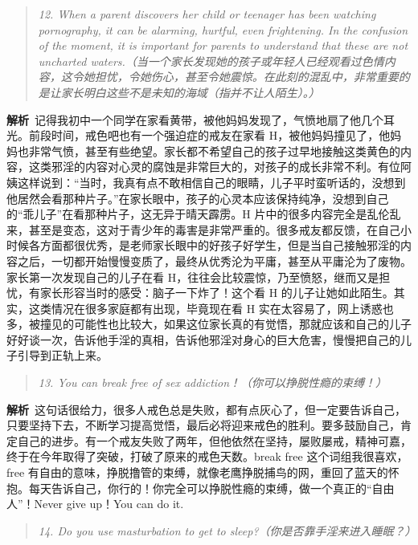\begin{quote}\it
    12. When a parent discovers her child or teenager has been watching pornography, it can be alarming, hurtful, even frightening. In the confusion of the moment, it is important for parents to understand that these are not uncharted waters.（当一个家长发现她的孩子或年轻人已经观看过色情内容，这令她担忧，令她伤心，甚至令她震惊。在此刻的混乱中，非常重要的是让家长明白这些不是未知的海域（指并不让人陌生）。）
\end{quote}

\textbf{解析}\ 记得我初中一个同学在家看黄带，被他妈妈发现了，气愤地扇了他几个耳光。前段时间，戒色吧也有一个强迫症的戒友在家看 H，被他妈妈撞见了，他妈妈也非常气愤，甚至有些绝望。家长都不希望自己的孩子过早地接触这类黄色的内容，这类邪淫的内容对心灵的腐蚀是非常巨大的，对孩子的成长非常不利。有位阿姨这样说到：“当时，我真有点不敢相信自己的眼睛，儿子平时蛮听话的，没想到他居然会看那种片子。”在家长眼中，孩子的心灵本应该保持纯净，没想到自己的“乖儿子”在看那种片子，这无异于晴天霹雳。H 片中的很多内容完全是乱伦乱来，甚至是变态，这对于青少年的毒害是非常严重的。很多戒友都反馈，在自己小时候各方面都很优秀，是老师家长眼中的好孩子好学生，但是当自己接触邪淫的内容之后，一切都开始慢慢变质了，最终从优秀沦为平庸，甚至从平庸沦为了废物。家长第一次发现自己的儿子在看 H，往往会比较震惊，乃至愤怒，继而又是担忧，有家长形容当时的感受：脑子一下炸了！这个看 H 的儿子让她如此陌生。其实，这类情况在很多家庭都有出现，毕竟现在看 H 实在太容易了，网上诱惑也多，被撞见的可能性也比较大，如果这位家长真的有觉悟，那就应该和自己的儿子好好谈一次，告诉他手淫的真相，告诉他邪淫对身心的巨大危害，慢慢把自己的儿子引导到正轨上来。

\begin{quote}\it
    13. You can break free of sex addiction！（你可以挣脱性瘾的束缚！）
\end{quote}

\textbf{解析}\ 这句话很给力，很多人戒色总是失败，都有点灰心了，但一定要告诉自己，只要坚持下去，不断学习提高觉悟，最后必将迎来戒色的胜利。要多鼓励自己，肯定自己的进步。有一个戒友失败了两年，但他依然在坚持，屡败屡戒，精神可嘉，终于在今年取得了突破，打破了原来的戒色天数。break free 这个词组我很喜欢，free 有自由的意味，挣脱撸管的束缚，就像老鹰挣脱捕鸟的网，重回了蓝天的怀抱。每天告诉自己，你行的！你完全可以挣脱性瘾的束缚，做一个真正的“自由人”！Never give up！You can do it.

\begin{quote}\it
    14. Do you use masturbation to get to sleep?（你是否靠手淫来进入睡眠？）
\end{quote}

